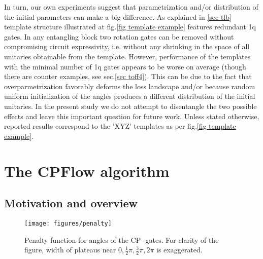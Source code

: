 \documentclass[twocolumn, amsfonts, amssymb, aps, nofootinbib]{revtex4-2}
\newcommand{\CP}{CP }
\begin{document}
In turn, our own experiments suggest that parametrization and/or distribution of the initial parameters can make a big difference. As explained in \ref{sec tlb} template structure illustrated at fig.\ref{fig template example} features redundant 1q gates. In any entangling block two rotation gates can be removed without compromising circuit expressivity, i.e. without any shrinking in the space of all unitaries obtainable from the template. However, performance of the templates with the minimal number of 1q gates appears to be worse on average (though there are counter examples, see sec.\ref{sec toff4}). This can be due to the fact that overparmetrization favorably deforms the loss landscape and/or because random uniform initialization of the angles produces a different distribution of the initial unitaries. In the present study we do not attempt to disentangle the two possible effects and leave this important question for future work. Unless stated otherwise, reported results correspond to the 'XYZ' templates as per fig.\ref{fig template example}.
\section{The CPFlow algorithm \label{sec cpflow}}
\subsection{Motivation and overview}
\begin{figure}
	\texttt{[image: figures/penalty]}
	\caption{Penalty function for angles of the \CP-gates. For clarity of the figure, width of plateaus near $0,\frac12\pi, \frac32\pi, 2\pi$ is exaggerated.}
	\label{fig penalty}
\end{figure}
\end{document}
